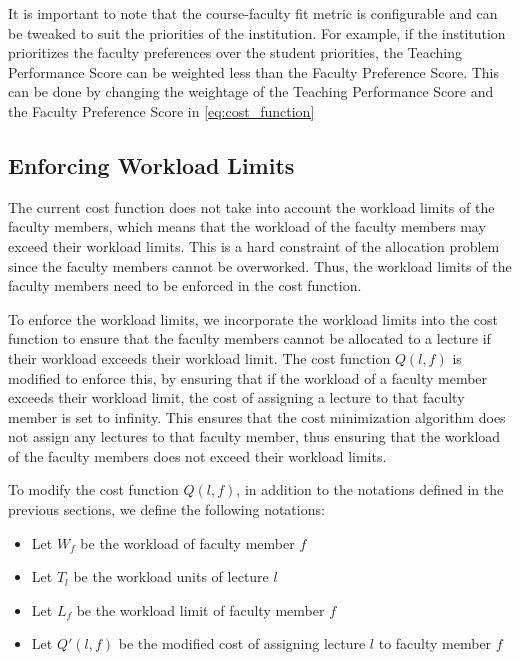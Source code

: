 It is important to note that the course-faculty fit metric is configurable and can be tweaked to suit the priorities of the institution. For example, if the institution prioritizes the faculty preferences over the student priorities, the Teaching Performance Score can be weighted less than the Faculty Preference Score. This can be done by changing the weightage of the Teaching Performance Score and the Faculty Preference Score in \autoref{eq:cost_function}

\subsection{Enforcing Workload Limits}

The current cost function does not take into account the workload limits of the faculty members, which means that the workload of the faculty members may exceed their workload limits. This is a hard constraint of the allocation problem since the faculty members cannot be overworked. Thus, the workload limits of the faculty members need to be enforced in the cost function.

To enforce the workload limits, we incorporate the workload limits into the cost function to ensure that the faculty members cannot be allocated to a lecture if their workload exceeds their workload limit. The cost function \( Q(l, f) \) is modified to enforce this, by ensuring that if the workload of a faculty member exceeds their workload limit, the cost of assigning a lecture to that faculty member is set to infinity. This ensures that the cost minimization algorithm does not assign any lectures to that faculty member, thus ensuring that the workload of the faculty members does not exceed their workload limits.

To modify the cost function \( Q(l, f) \), in addition to the notations defined in the previous sections, we define the following notations:

\begin{itemize}
  \item Let \( W_f \) be the workload of faculty member \( f \)
  \item Let \( T_l \) be the workload units of lecture \( l \)
  \item Let \( L_f \) be the workload limit of faculty member \( f \)
  \item Let \( Q'(l, f) \) be the modified cost of assigning lecture \( l \) to faculty member \( f \)
\end{itemize}

